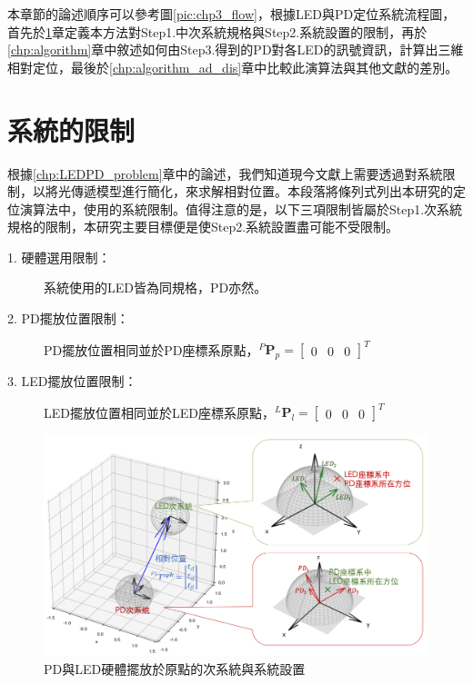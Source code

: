 本章節的論述順序可以參考圖\ref{pic:chp3_flow}，根據LED與PD定位系統流程圖，首先於\ref{chp:algorithm_constraint}章定義本方法對Step1.中次系統規格與Step2.系統設置的限制，再於\ref{chp:algorithm}章中敘述如何由Step3.得到的PD對各LED的訊號資訊，計算出三維相對定位，最後於\ref{chp:algorithm_ad_dis}章中比較此演算法與其他文獻的差別。








\section{系統的限制}
\label{chp:algorithm_constraint}

根據\ref{chp:LEDPD_problem}章中的論述，我們知道現今文獻上需要透過對系統限制，以將光傳遞模型進行簡化，來求解相對位置。本段落將條列式列出本研究的定位演算法中，使用的系統限制。值得注意的是，以下三項限制皆屬於Step1.次系統規格的限制，本研究主要目標便是使Step2.系統設置盡可能不受限制。

    \begin{description}

        \item[1. 硬體選用限制：]系統使用的LED皆為同規格，PD亦然。
        \item[2. PD擺放位置限制：]PD擺放位置相同並於PD座標系原點，$^P\boldsymbol{P}_p=
        \left[\begin{array}{ccc}0&0&0\end{array}\right]^T$
        \item[3. LED擺放位置限制：]LED擺放位置相同並於LED座標系原點，$^L\boldsymbol{P}_l=
        \left[\begin{array}{ccc}0&0&0\end{array}\right]^T$

    \end{description}
   
    \begin{figure}[htpb]
        \centering
        \includegraphics[width=14cm]{ch3pic/algorithm_place.png}
        \caption{PD與LED硬體擺放於原點的次系統與系統設置}
        \label{pic:algorithm_coor}
    \end{figure}

